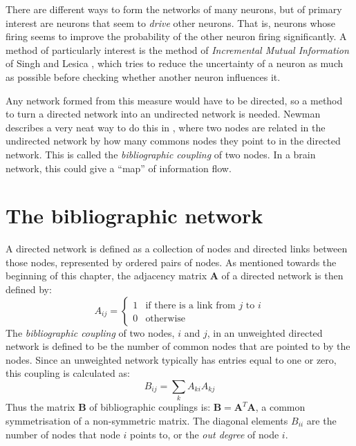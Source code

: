 There are different ways to form the networks of many neurons, but of primary interest are neurons that seem to {\sl drive} other neurons.  That 
is, neurons whose firing seems to improve the probability of the other neuron 
firing significantly.  A method of particularly interest is the method of 
{\sl Incremental Mutual Information} of Singh and Lesica 
\citep{SinghLesica2010a}, which tries to reduce the uncertainty of a neuron as 
much as possible before checking whether another neuron influences it.

Any network formed from this measure would have to be directed, so a 
method to turn a directed network into an undirected network is needed.  Newman describes 
a very neat way to do this in \citep{Newman2010a}, where two nodes are related 
in the undirected network by how many commons nodes they point to in the 
directed network.  This is called the {\sl bibliographic coupling} of two 
nodes.  In a brain network, this could give a ``map'' of information flow.

\section{The bibliographic network}
A directed network is defined as a collection of nodes and directed links between those nodes, represented by ordered pairs of nodes.  As mentioned towards the beginning of this chapter, the adjacency matrix $\mathbf{A}$ of a directed network is then defined by:
\begin{equation}
A_{ij} = \left\{ \begin{array}{ll} 1 & \text{if there is a link from $j$ to $i$} \\ 0 & \text{otherwise} \end{array}\right.
\end{equation}
The \emph{bibliographic coupling} of two nodes, $i$ and $j$, in an unweighted directed network is defined to be the number of common nodes that are pointed to by the nodes.  Since an unweighted network typically has entries equal to one or zero, this coupling is calculated as:
\begin{equation}
B_{ij} = \sum_k A_{ki} A_{kj}
\end{equation}
Thus the matrix $\mathbf{B}$ of bibliographic couplings is: $\mathbf{B} = \mathbf{A}^T\mathbf{A}$, a common symmetrisation of a non-symmetric matrix.  The diagonal elements $B_{ii}$ are the number of nodes that node $i$ points to, or the \emph{out degree} of node $i$.

